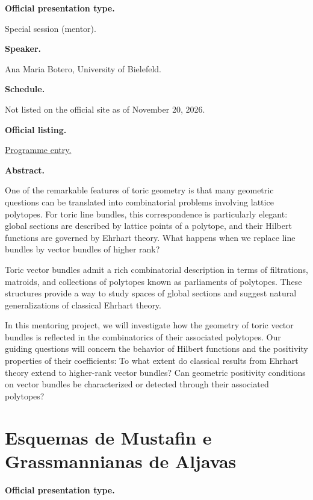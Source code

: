 \medskip\noindent
{\bf Official presentation type.}

Special session (mentor).

\medskip\noindent
{\bf Speaker.}

Ana Maria Botero, University of Bielefeld.

\medskip\noindent
{\bf Schedule.}

Not listed on the official site as of
November 20, 2026.

\medskip\noindent
{\bf Official listing.}

\href{%
https://sites.google.com/view/%
geoalgcompluff/legal/%
legal-2027-resumos#h.6f5k7zdb7c47%
}{Programme entry.}

\medskip\noindent
{\bf Abstract.}

One of the remarkable features of toric
geometry is that many geometric questions can
be translated into combinatorial problems
involving lattice polytopes. For toric line
bundles, this correspondence is particularly
elegant: global sections are described by
lattice points of a polytope, and their
Hilbert functions are governed by Ehrhart
theory. What happens when we replace line
bundles by vector bundles of higher rank?

Toric vector bundles admit a rich
combinatorial description in terms of
filtrations, matroids, and collections of
polytopes known as parliaments of polytopes.
These structures provide a way to study
spaces of global sections and suggest natural
generalizations of classical Ehrhart theory.

In this mentoring project, we will
investigate how the geometry of toric vector
bundles is reflected in the combinatorics of
their associated polytopes. Our guiding
questions will concern the behavior of
Hilbert functions and the positivity
properties of their coefficients: To what
extent do classical results from Ehrhart
theory extend to higher-rank vector bundles?
Can geometric positivity conditions on vector
bundles be characterized or detected through
their associated polytopes?

\section{Esquemas de Mustafin e
Grassmannianas de Aljavas}
\label{section-esquemas-de-mustafin-e}

\medskip\noindent
{\bf Official presentation type.}


